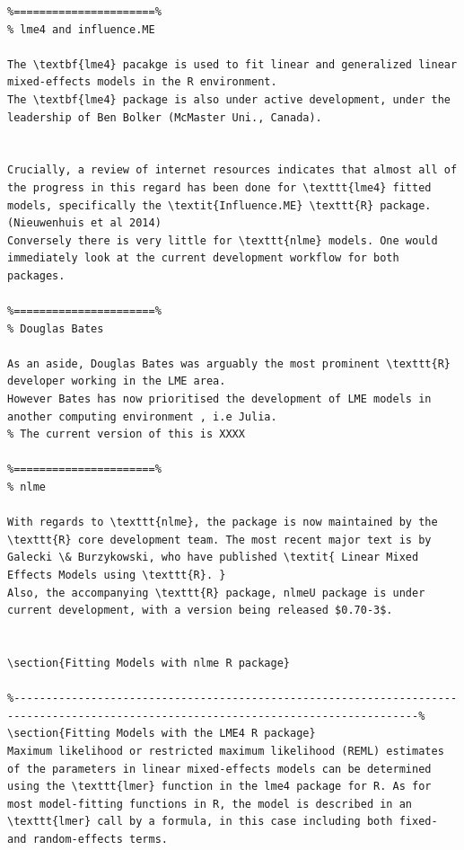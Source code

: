 \documentclass[Main.tex]{subfiles}
\begin{document}
\begin{verbatim}
%======================%
% lme4 and influence.ME

The \textbf{lme4} pacakge is used to fit linear and generalized linear mixed-effects models in the R environment.
The \textbf{lme4} package is also under active development, under the leadership of Ben Bolker (McMaster Uni., Canada).


Crucially, a review of internet resources indicates that almost all of the progress in this regard has been done for \texttt{lme4} fitted models, specifically the \textit{Influence.ME} \texttt{R} package. (Nieuwenhuis et al 2014)
Conversely there is very little for \texttt{nlme} models. One would immediately look at the current development workflow for both packages.

%======================%
% Douglas Bates

As an aside, Douglas Bates was arguably the most prominent \texttt{R} developer working in the LME area. 
However Bates has now prioritised the development of LME models in another computing environment , i.e Julia. 
% The current version of this is XXXX

%======================%
% nlme

With regards to \texttt{nlme}, the package is now maintained by the \texttt{R} core development team. The most recent major text is by Galecki \& Burzykowski, who have published \textit{ Linear Mixed Effects Models using \texttt{R}. }
Also, the accompanying \texttt{R} package, nlmeU package is under current development, with a version being released $0.70-3$.


\section{Fitting Models with nlme R package}

%-------------------------------------------------------------------------------------------------------------------------------------%
\section{Fitting Models with the LME4 R package}
Maximum likelihood or restricted maximum likelihood (REML) estimates of the parameters in linear mixed-effects models can be determined using the \texttt{lmer} function in the lme4 package for R. As for most model-fitting functions in R, the model is described in an \texttt{lmer} call by a formula, in this case including both fixed- and random-effects terms. 


\end{verbatim}
\end{document}
